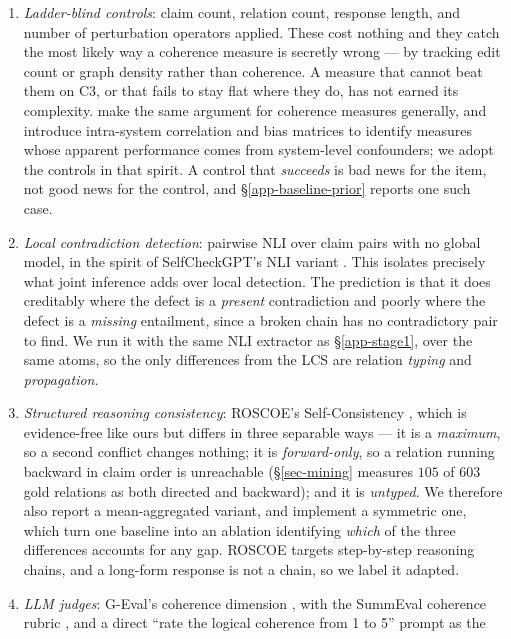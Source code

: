 \begin{enumerate}[leftmargin=1.6em,itemsep=2pt,topsep=3pt]
\item \emph{Ladder-blind controls}: claim count, relation count, response length, and number of
  perturbation operators applied. These cost nothing and they catch the most likely way a coherence
  measure is secretly wrong --- by tracking edit count or graph density rather than coherence. A
  measure that cannot beat them on C3, or that fails to stay flat where they do, has not earned its
  complexity. \citet{steenmarkert} make the same argument for coherence measures generally, and
  introduce intra-system correlation and bias matrices to identify measures whose apparent
  performance comes from system-level confounders; we adopt the controls in that spirit. A control
  that \emph{succeeds} is bad news for the item, not good news for the control, and
  \S\ref{app-baseline-prior} reports one such case.
\item \emph{Local contradiction detection}: pairwise NLI over claim pairs with no global model, in
  the spirit of SelfCheckGPT's NLI variant \citep{selfcheckgpt}. This isolates precisely what joint
  inference adds over local detection. The prediction is that it does creditably where the defect is
  a \emph{present} contradiction and poorly where the defect is a \emph{missing} entailment, since a
  broken chain has no contradictory pair to find. We run it with the same NLI extractor as
  \S\ref{app-stage1}, over the same atoms, so the only differences from the LCS are relation
  \emph{typing} and \emph{propagation}.
\item \emph{Structured reasoning consistency}: ROSCOE's Self-Consistency \citep{roscoe}, which is
  evidence-free like ours but differs in three separable ways --- it is a \emph{maximum}, so a second
  conflict changes nothing; it is \emph{forward-only}, so a relation running backward in claim order
  is unreachable (\S\ref{sec-mining} measures $105$ of $603$ gold relations as both directed and
  backward); and it is \emph{untyped}. We therefore also report a mean-aggregated variant, and
  implement a symmetric one, which turn one baseline into an ablation identifying \emph{which} of the
  three differences accounts for any gap. ROSCOE targets step-by-step reasoning chains, and a
  long-form response is not a chain, so we label it adapted.
\item \emph{LLM judges}: G-Eval's coherence dimension \citep{geval}, with the SummEval coherence
  rubric \citep{summeval}, and a direct ``rate the logical coherence from 1 to 5'' prompt as the

\end{enumerate}
